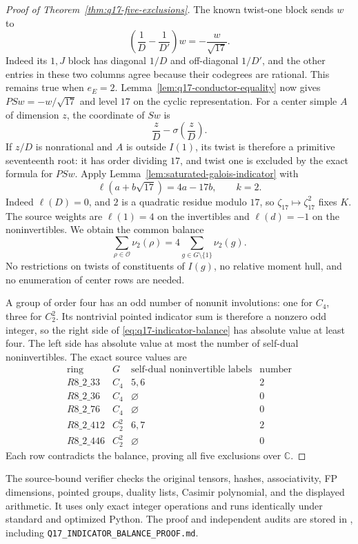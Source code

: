 \begin{proof}[Proof of Theorem~\ref{thm:q17-five-exclusions}]
The known twist-one block sends $w$ to
\[
\left(\frac1D-\frac1{D'}\right)w=-\frac{w}{\sqrt{17}}.
\]
Indeed its $1,J$ block has diagonal $1/D$ and off-diagonal $1/D'$,
and the other entries in these two columns agree because their
codegrees are rational. This remains true when $e_E=2$.
Lemma~\ref{lem:q17-conductor-equality} now gives
$PSw=-w/\sqrt{17}$ and level $17$ on the cyclic representation.
For a center simple $A$ of dimension $z$, the coordinate of $Sw$ is
\[
\frac zD-\sigma\!\left(\frac zD\right).
\]
If $z/D$ is nonrational and $A$ is outside $I(1)$, its twist is therefore
a primitive seventeenth root: it has order dividing $17$, and twist
one is excluded by the exact formula for $PSw$. Apply Lemma~\ref{lem:saturated-galois-indicator} with
\[
\ell(a+b\sqrt{17})=4a-17b,\qquad k=2.
\]
Indeed $\ell(D)=0$, and $2$ is a quadratic residue modulo $17$, so
$\zeta_{17}\mapsto\zeta_{17}^2$ fixes $K$. The source weights are
$\ell(1)=4$ on the invertibles and $\ell(d)=-1$ on the
noninvertibles. We obtain the common balance
\begin{equation}\label{eq:q17-indicator-balance}
\boxed{\displaystyle
\sum_{\rho\in\mathcal O}\nu_2(\rho)
 =4\sum_{g\in G\setminus\{1\}}\nu_2(g).}
\end{equation}
No restrictions on twists of constituents of $I(g)$, no relative
moment hull, and no enumeration of center rows are needed.

A group of order four has an odd number of nonunit involutions: one
for $C_4$, three for $C_2^2$. Its nontrivial pointed indicator sum is
therefore a nonzero odd integer, so the right side of
\eqref{eq:q17-indicator-balance} has absolute value at least four.
The left side has absolute value at most the number of self-dual
noninvertibles. The exact source values are
\[
\begin{array}{c|c|c|c}
\text{ring}&G&\text{self-dual noninvertible labels}&\text{number}\\\hline
R8\_2\_33&C_4&5,6&2\\
R8\_2\_36&C_4&\varnothing&0\\
R8\_2\_76&C_4&\varnothing&0\\
R8\_2\_412&C_2^2&6,7&2\\
R8\_2\_446&C_2^2&\varnothing&0
\end{array}
\]
Each row contradicts the balance, proving all five exclusions over
$\mathbb C$.
\end{proof}

The source-bound verifier 
checks the original tensors, hashes, associativity, FP dimensions,
pointed groups, duality lists, Casimir polynomial, and the displayed
arithmetic. It uses only exact integer operations and runs identically
under standard and optimized Python. The proof and independent audits
are stored in , including
\texttt{Q17\_INDICATOR\_BALANCE\_PROOF.md}.

